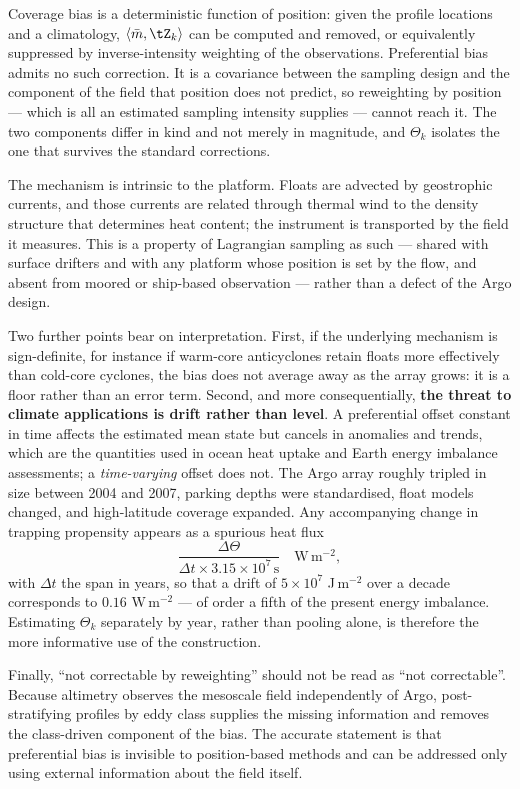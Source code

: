 \begin{remark}
\label{rem:whycare}
Coverage bias is a deterministic function of position: given the profile locations and a
climatology, $\langle \bar{m}, \tZ_k\rangle$ can be computed and removed, or equivalently
suppressed by inverse-intensity weighting of the observations. Preferential bias admits no such
correction. It is a covariance between the sampling design and the component of the field that
position does not predict, so reweighting by position --- which is all an estimated sampling
intensity supplies --- cannot reach it. The two components differ in kind and not merely in
magnitude, and $\Theta_k$ isolates the one that survives the standard corrections.

The mechanism is intrinsic to the platform. Floats are advected by geostrophic currents, and
those currents are related through thermal wind to the density structure that determines heat
content; the instrument is transported by the field it measures. This is a property of Lagrangian
sampling as such --- shared with surface drifters and with any platform whose position is set by
the flow, and absent from moored or ship-based observation --- rather than a defect of the Argo
design.

Two further points bear on interpretation. First, if the underlying mechanism is sign-definite,
for instance if warm-core anticyclones retain floats more effectively than cold-core cyclones,
the bias does not average away as the array grows: it is a floor rather than an error term.
Second, and more consequentially, \textbf{the threat to climate applications is drift rather than
level}. A preferential offset constant in time affects the estimated mean state but cancels in
anomalies and trends, which are the quantities used in ocean heat uptake and Earth energy
imbalance assessments; a \emph{time-varying} offset does not. The Argo array roughly tripled in
size between 2004 and 2007, parking depths were standardised, float models changed, and
high-latitude coverage expanded. Any accompanying change in trapping propensity appears as a
spurious heat flux
\begin{equation}
  \label{eq:flux}
  \frac{\Delta\Theta}{\Delta t \times 3.15\times10^{7}\,\mathrm{s}} \quad \mathrm{W\,m^{-2}},
\end{equation}
with $\Delta t$ the span in years, so that a drift of $5\times10^{7}$ J\,m$^{-2}$ over a decade
corresponds to $0.16$ W\,m$^{-2}$ --- of order a fifth of the present energy imbalance.
Estimating $\Theta_k$ separately by year, rather than pooling alone, is therefore the more
informative use of the construction.

Finally, ``not correctable by reweighting'' should not be read as ``not correctable''. Because
altimetry observes the mesoscale field independently of Argo, post-stratifying profiles by eddy
class supplies the missing information and removes the class-driven component of the bias. The
accurate statement is that preferential bias is invisible to position-based methods and can be
addressed only using external information about the field itself.
\end{remark}

